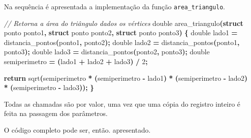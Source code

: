 \documentclass[
  11pt,
  a4paper,
]{scrbook}
\newenvironment{Shaded}{\begin{snugshade}}{\end{snugshade}}
\newcommand{\CommentTok}[1]{\textcolor[rgb]{0.56,0.35,0.01}{\textit{#1}}}
\newcommand{\ControlFlowTok}[1]{\textcolor[rgb]{0.13,0.29,0.53}{\textbf{#1}}}
\newcommand{\DataTypeTok}[1]{\textcolor[rgb]{0.13,0.29,0.53}{#1}}
\newcommand{\DecValTok}[1]{\textcolor[rgb]{0.00,0.00,0.81}{#1}}
\newcommand{\KeywordTok}[1]{\textcolor[rgb]{0.13,0.29,0.53}{\textbf{#1}}}
\newcommand{\NormalTok}[1]{#1}
\newcommand{\OperatorTok}[1]{\textcolor[rgb]{0.81,0.36,0.00}{\textbf{#1}}}
\begin{document}
Na sequência é apresentada a implementação da função
\texttt{area\_triangulo}.

\begin{Shaded}
\begin{Highlighting}[]
\CommentTok{// Retorna a área do triângulo dados os vértices}
\DataTypeTok{double}\NormalTok{ area\_triangulo}\OperatorTok{(}\KeywordTok{struct}\NormalTok{ ponto ponto1}\OperatorTok{,}
                      \KeywordTok{struct}\NormalTok{ ponto ponto2}\OperatorTok{,}
                      \KeywordTok{struct}\NormalTok{ ponto ponto3}\OperatorTok{)} \OperatorTok{\{}
    \DataTypeTok{double}\NormalTok{ lado1 }\OperatorTok{=}\NormalTok{ distancia\_pontos}\OperatorTok{(}\NormalTok{ponto1}\OperatorTok{,}\NormalTok{ ponto2}\OperatorTok{);}
    \DataTypeTok{double}\NormalTok{ lado2 }\OperatorTok{=}\NormalTok{ distancia\_pontos}\OperatorTok{(}\NormalTok{ponto1}\OperatorTok{,}\NormalTok{ ponto3}\OperatorTok{);}
    \DataTypeTok{double}\NormalTok{ lado3 }\OperatorTok{=}\NormalTok{ distancia\_pontos}\OperatorTok{(}\NormalTok{ponto2}\OperatorTok{,}\NormalTok{ ponto3}\OperatorTok{);}
    \DataTypeTok{double}\NormalTok{ semiperimetro }\OperatorTok{=} \OperatorTok{(}\NormalTok{lado1 }\OperatorTok{+}\NormalTok{ lado2 }\OperatorTok{+}\NormalTok{ lado3}\OperatorTok{)} \OperatorTok{/} \DecValTok{2}\OperatorTok{;}

    \ControlFlowTok{return}\NormalTok{ sqrt}\OperatorTok{(}\NormalTok{semiperimetro }\OperatorTok{*} \OperatorTok{(}\NormalTok{semiperimetro }\OperatorTok{{-}}\NormalTok{ lado1}\OperatorTok{)} \OperatorTok{*}
                \OperatorTok{(}\NormalTok{semiperimetro }\OperatorTok{{-}}\NormalTok{ lado2}\OperatorTok{)} \OperatorTok{*} \OperatorTok{(}\NormalTok{semiperimetro }\OperatorTok{{-}}\NormalTok{ lado3}\OperatorTok{));}
\OperatorTok{\}}
\end{Highlighting}
\end{Shaded}

Todas as chamadas são por valor, uma vez que uma cópia do registro
inteiro é feita na passagem dos parâmetros.

O código completo pode ser, então. apresentado.
\end{document}
